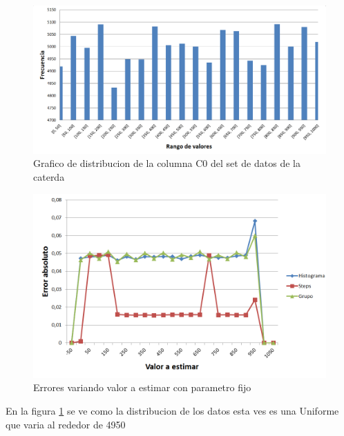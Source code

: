 		\newpage							
	\begin{figure}[H]
	  \begin{center}
	    \includegraphics[scale=.50]{imagenes/distro_C0.png}
	    \caption{Grafico de distribucion de la columna C0 del set de datos de la caterda} 
	    \label{fig:(distro_C0}
	  \end{center}
	\end{figure}

	\begin{figure}[H]
	  \begin{center}
	    \includegraphics[scale=.40]{imagenes/C0_variando_valor.png}
	    \caption{Errores variando valor a estimar con parametro fijo} 
	    \label{fig:C0_variando_valor}
	  \end{center}
	\end{figure}	

		En la figura \ref{fig:(distro_C0} se ve como la distribucion de los datos esta ves es una Uniforme que varia al rededor de 4950
		
